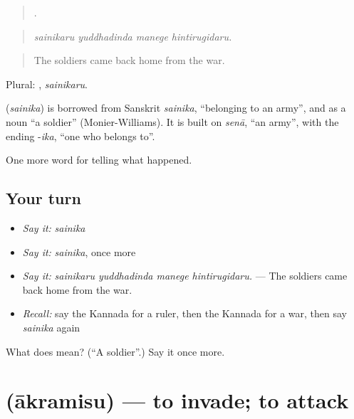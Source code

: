 \begin{quote}
   .
\end{quote}

\begin{quote}
\emph{sainikaru yuddhadinda manege hintirugidaru.}
\end{quote}

\begin{quote}
The soldiers came back home from the war.
\end{quote}

Plural: , \emph{sainikaru}.

\begin{cousinweb}
\textbf{} (\emph{sainika}) is borrowed from Sanskrit \emph{sainika}, \textquotedblleft{}belonging to an army\textquotedblright{}, and as a noun \textquotedblleft{}a soldier\textquotedblright{} (Monier-Williams). It is built on \emph{senā}, \textquotedblleft{}an army\textquotedblright{}, with the ending -\emph{ika}, \textquotedblleft{}one who belongs to\textquotedblright{}.
\end{cousinweb}

\begin{grammarlens}[title={What you've built}]
One more word for telling what happened.
\end{grammarlens}

\subsection*{Your turn}
\begin{itemize}
\raggedright
  \item \emph{Say it:} \emph{sainika}
  \item \emph{Say it:} \emph{sainika}, once more
  \item \emph{Say it:} \emph{sainikaru yuddhadinda manege hintirugidaru.} — The soldiers came back home from the war.
  \item \emph{Recall:} say the Kannada for a ruler, then the Kannada for a war, then say \emph{sainika} again
\end{itemize}

\begin{tcolorbox}[breakable,colback=teal!4,colframe=teal!35!black,title={Before you move on}]
What does  mean? (\textquotedblleft{}A soldier\textquotedblright{}.) Say it once more.
\end{tcolorbox}
\section[\texorpdfstring{\kn{ಆಕ್ರಮಿಸು} (ākramisu)}{ಆಕ್ರಮಿಸು (ākramisu)}]{ (ākramisu) — to invade; to attack}

